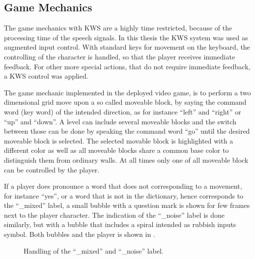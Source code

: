 
\subsection{Game Mechanics}\label{sec:game_design_mechanics}
The game mechanics with KWS are a highly time restricted, because of the processing time of the speech signals.
In this thesis the KWS system was used as augmented input control.
With standard keys for movement on the keyboard, the controlling of the character is handled, so that the player receives immediate feedback. 
For other more special actions, that do not require immediate feedback, a KWS control was applied.

The game mechanic implemented in the deployed video game, is to perform a two dimensional grid move upon a so called moveable block, by saying the command word (key word) of the intended direction, as for instance \enquote{left} and \enquote{right} or \enquote{up} and \enquote{down}.
A level can include several moveable blocks and the switch between those can be done by speaking the command word \enquote{go} until the desired moveable block is selected.
The selected movable block is highlighted with a different color as well as all moveable blocks share a common base color to distinguish them from ordinary walls.
At all times only one of all moveable block can be controlled by the player.

If a player does pronounce a word that does not corresponding to a movement, for instance \enquote{yes}, or a word that is not in the dictionary, hence corresponds to the \enquote{\_mixed} label, a small bubble with a question mark is shown for few frames next to the player character.
The indication of the \enquote{\_noise} label is done similarly, but with a bubble that includes a spiral intended as rubbish inputs symbol.
Both bubbles and the player is shown in .
\begin{figure}[!ht]
  \centering
  \hspace{3cm}
  \caption{Handling of the \enquote{\_mixed} and \enquote{\_noise} label.}
  \label{fig:game_design_mechanic_bubble}
\end{figure}
\FloatBarrier
\noindent

